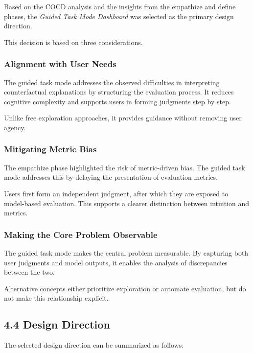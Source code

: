 \documentclass[
  letterpaper,
  DIV=11,
  numbers=noendperiod]{scrartcl}
\begin{document}
Based on the COCD analysis and the insights from the empathize and
define phases, the \emph{Guided Task Mode Dashboard} was selected as the
primary design direction.

This decision is based on three considerations.

\subsubsection{Alignment with User
Needs}\label{alignment-with-user-needs}

The guided task mode addresses the observed difficulties in interpreting
counterfactual explanations by structuring the evaluation process. It
reduces cognitive complexity and supports users in forming judgments
step by step.

Unlike free exploration approaches, it provides guidance without
removing user agency.

\subsubsection{Mitigating Metric Bias}\label{mitigating-metric-bias}

The empathize phase highlighted the risk of metric-driven bias. The
guided task mode addresses this by delaying the presentation of
evaluation metrics.

Users first form an independent judgment, after which they are exposed
to model-based evaluation. This supports a clearer distinction between
intuition and metrics.

\subsubsection{Making the Core Problem
Observable}\label{making-the-core-problem-observable}

The guided task mode makes the central problem measurable. By capturing
both user judgments and model outputs, it enables the analysis of
discrepancies between the two.

Alternative concepts either prioritize exploration or automate
evaluation, but do not make this relationship explicit.

\subsection{4.4 Design Direction}\label{design-direction}

The selected design direction can be summarized as follows:
\end{document}

